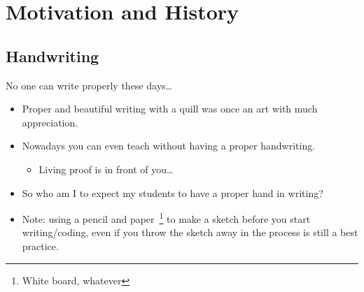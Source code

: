 \section[Motivation]{Motivation and History}
\subsection{Handwriting}
{
  \begin{frame}{No one can write properly these days\ldots}
    \begin{itemize}
    \item Proper and beautiful writing with a quill was once an art with
      much appreciation.
    \item Nowadays you can even teach without having a proper handwriting.
      \begin{itemize}
      \item Living proof is in front of you\ldots
      \end{itemize}

    \item So who am I to expect my students to have a proper hand in writing?

    \item Note: using a pencil and paper~\footnote{White board, whatever} to make a sketch before you start
      writing/coding, even if you throw the sketch away in the process is
      still a best practice.
    \end{itemize}

  \end{frame}
}

